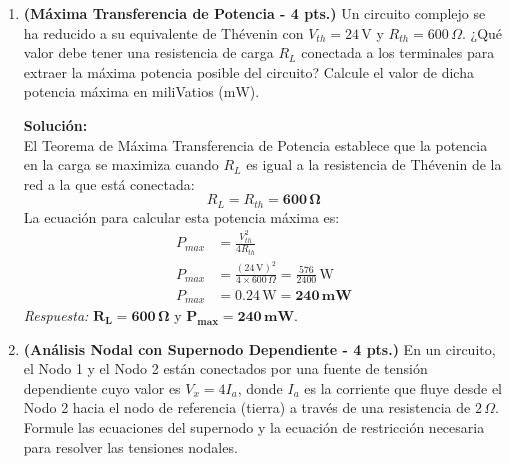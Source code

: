 \documentclass[12pt, a4paper]{article}
\begin{document}
\begin{enumerate}[leftmargin=*, itemsep=2em]
    \textbf{Solución:} \\
    Al retirar la resistencia $R_2$, los terminales donde estaba conectada quedan en circuito abierto. Al no haber un camino cerrado, la corriente que fluye por $R_1$ es $0\,\text{A}$.
    \begin{itemize}
        \item \textbf{Cálculo de $V_{th}$:} Como no hay caída de tensión en $R_1$ (debido a que $V_{R1} = 0\,\text{A} \times 2\,\Omega = 0\,\text{V}$), la tensión en los terminales abiertos es exactamente la tensión de la fuente ideal:
        \[ V_{th} = 10\,\text{V} \]
        \item \textbf{Cálculo de $R_{th}$:} Para encontrar la resistencia equivalente, "apagamos" las fuentes independientes. La fuente de tensión de $10\,\text{V}$ se sustituye por un cortocircuito. Mirando desde los terminales abiertos hacia la red, solo observamos la resistencia $R_1$:
        \[ R_{th} = R_1 = 2\,\Omega \]
    \end{itemize}
    \textit{Respuesta:} $\mathbf{V_{th} = 10\,\text{V}}$ y $\mathbf{R_{th} = 2\,\Omega}$.

    \item \textbf{(Máxima Transferencia de Potencia - 4 pts.)} Un circuito complejo se ha reducido a su equivalente de Thévenin con $V_{th} = 24\,\text{V}$ y $R_{th} = 600\,\Omega$. ¿Qué valor debe tener una resistencia de carga $R_L$ conectada a los terminales para extraer la máxima potencia posible del circuito? Calcule el valor de dicha potencia máxima en miliVatios ($\text{mW}$).

    \textbf{Solución:} \\
    El Teorema de Máxima Transferencia de Potencia establece que la potencia en la carga se maximiza cuando $R_L$ es igual a la resistencia de Thévenin de la red a la que está conectada:
    \[ R_L = R_{th} = \mathbf{600\,\Omega} \]
    La ecuación para calcular esta potencia máxima es:
    \begin{align*}
        P_{max} &= \frac{V_{th}^2}{4 R_{th}} \\
        P_{max} &= \frac{(24\,\text{V})^2}{4 \times 600\,\Omega} = \frac{576}{2400}\,\text{W} \\
        P_{max} &= 0.24\,\text{W} = \mathbf{240\,\text{mW}}
    \end{align*}
    \textit{Respuesta:} $\mathbf{R_L = 600\,\Omega}$ y $\mathbf{P_{max} = 240\,\text{mW}}$.

    \item \textbf{(Análisis Nodal con Supernodo Dependiente - 4 pts.)} En un circuito, el Nodo 1 y el Nodo 2 están conectados por una fuente de tensión dependiente cuyo valor es $V_x = 4 I_a$, donde $I_a$ es la corriente que fluye desde el Nodo 2 hacia el nodo de referencia (tierra) a través de una resistencia de $2\,\Omega$. Formule las ecuaciones del supernodo y la ecuación de restricción necesaria para resolver las tensiones nodales.


\end{enumerate}
\end{document}
